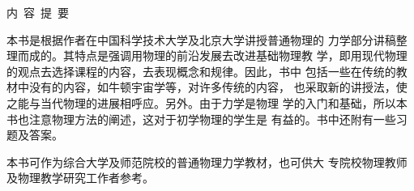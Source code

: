 \begin{center}\begin{minipage}{8.4cm}\vspace{3cm}
        \begin{center}\heiti 内~容~提~要\end{center}
        \normalfont {}
        \hspace{2em}本书是根据作者在中国科学技术大学及北京大学讲授普通物理的
        力学部分讲稿整理而成的。其特点是强调用物理的前沿发展去改进基础物理教
        学，即用现代物理的观点去选择课程的内容，去表现概念和规律。因此，书中
        包括一些在传统的教材中没有的内容，如牛顿宇宙学等，对许多传统的内容，
        也采取新的讲授法，使之能与当代物理的进展相呼应。另外。由于力学是物理
        学的入门和基础，所以本书也注意物理方法的阐述，这对于初学物理的学生是
        有益的。书中还附有一些习题及答案。

        \hspace{2em}本书可作为综合大学及师范院校的普通物理力学教材，也可供大
        专院校物理教师及物理教学研究工作者参考。
\end{minipage}\end{center}
\thispagestyle{empty}
\clearpage